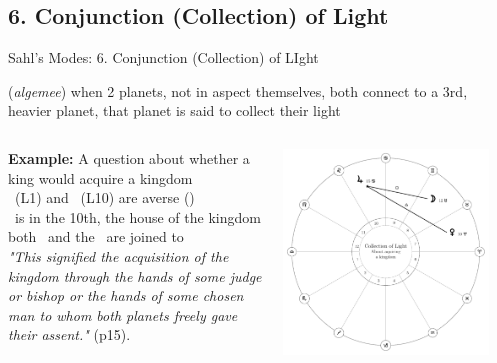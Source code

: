 \subsection{6. Conjunction (Collection) of Light}
\begin{frame}[t]{Sahl's Modes: 6. Conjunction (Collection) of LIght}
\begin{description}[style=nextline]
\item[6. Collection of Light] (\textsl{algemee}) when 2 planets, not in aspect themselves, both connect to a 3rd, heavier planet, that planet is said to collect their light
\vspace{0.25cm}
\begin{columns}[T, onlytextwidth]
\textbf{Example:} A question about whether a king would acquire a kingdom \\
\ul
\Venus\ (L1) and \Moon\ (L10) are averse (\Semisextile) \\
\Jupiter\ is in the 10th, the house of the kingdom \\
both \Venus\ and the \Moon\ are joined to \Jupiter \\
\vspace{0.25cm}
\textsl{"This signified the acquisition of the kingdom through the hands of some judge or bishop or the hands of some chosen man to whom both planets freely gave their assent."} (p15). \\
\vspace{0.25cm}

\vspace{-0.5cm}
\begin{center}
{\includegraphics[width=0.9\textwidth]{charts/61-collection}} \\
\end{center}
\end{columns}
\end{description}
\end{frame}
